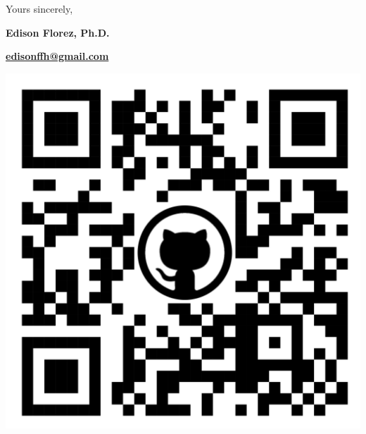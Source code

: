 \vfill
\begin{minipage}[c]{.75\textwidth}
    Yours sincerely,

    \vspace*{3mm}

    \textbf{Edison Florez, Ph.D.}

    \href{mailto:edisonffh@gmail.com}{\bf edisonffh@gmail.com}


\end{minipage}
\begin{minipage}[c]{.2\textwidth}
    \centering
    \href{https://github.com/e-florez/}{
        \includegraphics[scale=0.02]{figs/qrcode_github_page.png}
    }
\end{minipage}

